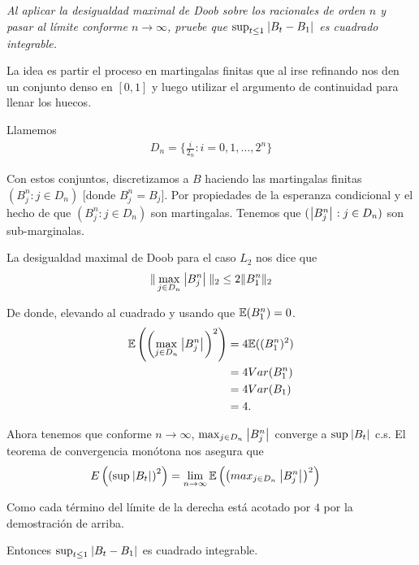 \emph{
    Al aplicar la desigualdad maximal de Doob sobre los racionales de orden $n$ y pasar al l\'imite 
    conforme $n\to\infty$, pruebe que $\sup_{t\leq 1}\hspace{.25mm}\left|B_t-B_1\right|\hspace{.25mm}$ es cuadrado integrable.\pn
}

\afterstatement\pn

La idea es partir el proceso en martingalas finitas que al irse refinando nos den un conjunto denso en $[0, 1]$ y
luego utilizar el argumento de continuidad para llenar los huecos.\pn

Llamemos 
\begin{align}
 D_n = \bigg\{ \frac{i}{2_n} : i = 0, 1, \dots, 2^n \bigg \}   
\end{align}

Con estos conjuntos, discretizamos a $B$ haciendo las martingalas finitas
$(B_j^n : j \in D_n)$ [donde $B_j^n = B_j$]. Por propiedades de la esperanza condicional y el hecho de que
$(B_j^n : j \in D_n)$ son martingalas. Tenemos que $(\hspace{.25mm}\left|B_j^n\right|\hspace{.25mm} : j \in D_n)$ son sub-marginalas.\pn

La desigualdad maximal de Doob para el caso $L_2$ nos dice que
\begin{align}
        \| \max_{j \in D_n} \hspace{.25mm}\left|B_j^n\right|\hspace{.25mm} \|_2 \leq 2 \| B_1^n\|_2
\end{align}

De donde, elevando al cuadrado y usando que $\mathbb{E}(B_1^n) = 0$.
\begin{align}
        \mathbb{E}\left( \left( \max_{j \in D_n} \hspace{.25mm}\left|B_j^n\right|\hspace{.25mm} \right)^2 \right)  &=  4 \mathbb{E}( (B_1^n)^2 )   \\
                                                                        &=  4 Var(B_1^n)        \\
                                                                        &=  4 Var(B_1)          \\
                                                                        &=  4.
\end{align}\pn

Ahora tenemos que conforme $n \rightarrow \infty$, $\max_{j \in D_n} \hspace{.25mm}\left|B_j^n\right|\hspace{.25mm}$ converge a $\sup \hspace{.25mm}\left|B_t\right|\hspace{.25mm}$ c.s.
El teorema de convergencia monótona nos asegura que
\begin{align}
        E\left( \left( \sup \hspace{.25mm}\left|B_t\right|\hspace{.25mm} \right)^2 \right) &= \lim_{n \rightarrow \infty}   \mathbb{E}\left( \left( max_{j \in D_n} \hspace{.25mm}\left|B_j^n\right|\hspace{.25mm} \right)^2 \right)
\end{align}\pn

Como cada término del límite de la derecha está acotado por $4$ por la demostración de arriba.\pn

Entonces  $\sup_{t\leq 1}\hspace{.25mm}\left|B_t-B_1\right|\hspace{.25mm}$ es cuadrado integrable.